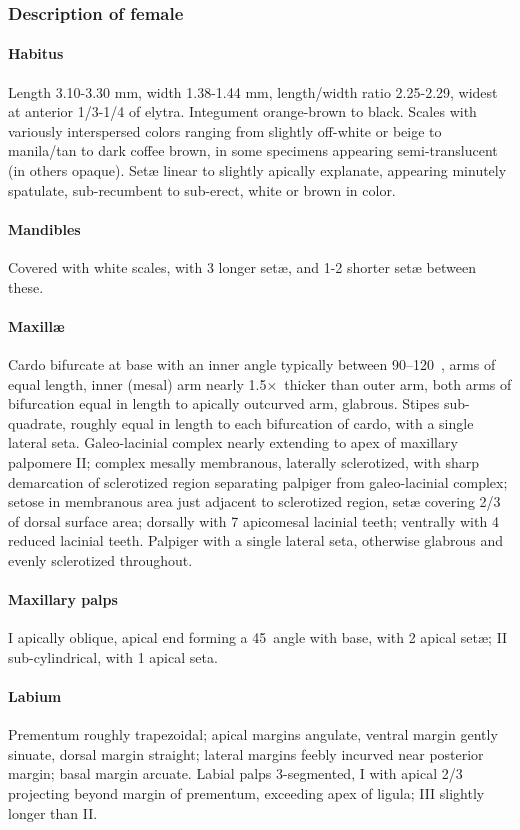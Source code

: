 \documentclass[fleqn,10pt,lineno]{wlpeerj} %
\newcommand{\td}{\textdegree~}
\newcommand{\x}{$\times$~}
\begin{document}
		\subsubsection*{Description of female}
			\paragraph{Habitus}
				Length 3.10-3.30 mm, width 1.38-1.44 mm, length/width ratio 2.25-2.29, widest at anterior 1/3-1/4 of elytra.
				Integument orange-brown to black. 
				Scales with variously interspersed colors ranging from slightly off-white or beige to manila/tan to dark coffee brown, in some specimens appearing semi-translucent (in others opaque). 
				Set{\ae} linear to slightly apically explanate, appearing minutely spatulate, sub-recumbent to sub-erect, white or brown in color.
			\paragraph{Mandibles}
				Covered with white scales, with 3 longer set{\ae}, and 1-2 shorter set{\ae} between these.
			\paragraph{Maxill{\ae}}
				Cardo bifurcate at base with an inner angle typically between 90–120\td, arms of equal length, inner (mesal) arm nearly 1.5\x thicker than outer arm, both arms of bifurcation equal in length to apically outcurved arm, glabrous. 
				Stipes sub-quadrate, roughly equal in length to each bifurcation of cardo, with a single lateral seta. 
				Galeo-lacinial complex nearly extending to apex of maxillary palpomere II; complex mesally membranous, laterally sclerotized, with sharp demarcation of sclerotized region separating palpiger from galeo-lacinial complex; setose in membranous area just adjacent to sclerotized
region, set{\ae} covering 2/3 of dorsal surface area; dorsally with 7 apicomesal lacinial teeth; ventrally with 4 reduced lacinial teeth. 
				Palpiger with a single lateral seta, otherwise glabrous and evenly sclerotized throughout.
			\paragraph{Maxillary palps}
				I apically oblique, apical end forming a 45\td angle with base, with 2 apical set{\ae}; II sub-cylindrical, with 1 apical seta.
			\paragraph{Labium}
				Prementum roughly trapezoidal; apical margins angulate, ventral margin gently sinuate, dorsal margin straight; lateral margins feebly incurved near posterior margin; basal margin arcuate.
				Labial palps 3-segmented, I with apical 2/3 projecting beyond margin of prementum, exceeding apex of ligula; III slightly longer than II.
\end{document}
